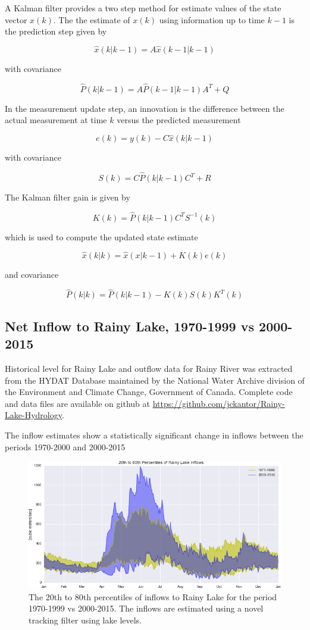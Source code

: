 \documentclass[preprint,times]{elsarticle}
\begin{document}
A Kalman filter provides a two step method for estimate values of the state vector $x(k)$. The the estimate of $x(k)$ using information up to time $k-1$ is the prediction step given by 

$$\hat{x}(k|k-1) = A \hat{x}(k-1|k-1)$$

\noindent
with covariance

$$\hat{P}(k|k-1) = A \hat{P}(k-1|k-1) A^T + Q$$

In the measurement update step, an innovation is the difference between the actual measurement at time $k$ versus the predicted measurement

$$e(k) = y(k) - C \hat{x}(k|k-1)$$

\noindent
with covariance

$$S(k) = C\hat{P}(k|k-1)C^T + R$$

\noindent
The Kalman filter gain is given by

$$K(k) = \hat{P}(k|k-1)C^TS^{-1}(k)$$

\noindent
which is used to compute the updated state estimate

$$\hat{x}(k|k) = \hat{x}(x|k-1) + K(k)e(k)$$

and covariance

$$\hat{P}(k|k) = \hat{P}(k|k-1) - K(k)S(k)K^T(k)$$

\subsection{Net Inflow to Rainy Lake, 1970-1999 vs 2000-2015}

Historical level for Rainy Lake and outflow data for Rainy River was extracted from the HYDAT Database maintained by the National Water Archive division of the Environment and Climate Change, Government of Canada. Complete code and data files are available on github at \url{https://github.com/jckantor/Rainy-Lake-Hydrology}.

The inflow estimates show a statistically significant change in inflows between the periods 1970-2000 and 2000-2015

\begin{figure}
\includegraphics[width=\linewidth]{RainyLakeInflows}
\caption{The 20th to 80th percentiles of inflows to Rainy Lake for the period 1970-1999 vs 2000-2015. The inflows are estimated using a novel tracking filter using lake levels.}\label{figure:7}
\end{figure}
\end{document}
